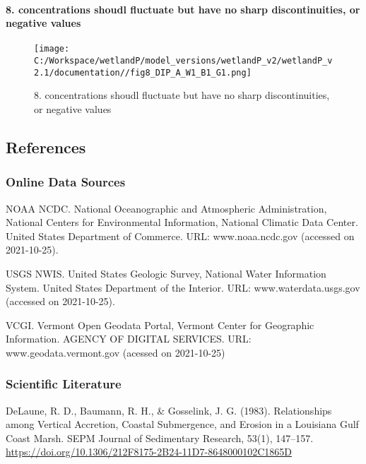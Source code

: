 \documentclass[
]{article}
\begin{document}
\hypertarget{concentrations-shoudl-fluctuate-but-have-no-sharp-discontinuities-or-negative-values}{%
\paragraph{8. concentrations shoudl fluctuate but have no sharp
discontinuities, or negative
values}\label{concentrations-shoudl-fluctuate-but-have-no-sharp-discontinuities-or-negative-values}}

\begin{figure}
\centering
\texttt{[image: C:/Workspace/wetlandP/model\_versions/wetlandP\_v2/wetlandP\_v2.1/documentation//fig8\_DIP\_A\_W1\_B1\_G1.png]}
\caption{8. concentrations shoudl fluctuate but have no sharp
discontinuities, or negative values}
\end{figure}

\hypertarget{references}{%
\subsection{References}\label{references}}

\hypertarget{online-data-sources}{%
\subsubsection{Online Data Sources}\label{online-data-sources}}

NOAA NCDC. National Oceanographic and Atmospheric Administration,
National Centers for Environmental Information, National Climatic Data
Center. United States Department of Commerce. URL: www.noaa.ncdc.gov
(accessed on 2021-10-25).

USGS NWIS. United States Geologic Survey, National Water Information
System. United States Department of the Interior. URL:
www.waterdata.usgs.gov (accessed on 2021-10-25).

VCGI. Vermont Open Geodata Portal, Vermont Center for Geographic
Information. AGENCY OF DIGITAL SERVICES. URL: www.geodata.vermont.gov
(acessed on 2021-10-25)

\hypertarget{scientific-literature}{%
\subsubsection{Scientific Literature}\label{scientific-literature}}

DeLaune, R. D., Baumann, R. H., \& Gosselink, J. G. (1983).
Relationships among Vertical Accretion, Coastal Submergence, and Erosion
in a Louisiana Gulf Coast Marsh. SEPM Journal of Sedimentary Research,
53(1), 147--157.
\url{https://doi.org/10.1306/212F8175-2B24-11D7-8648000102C1865D}
\end{document}
